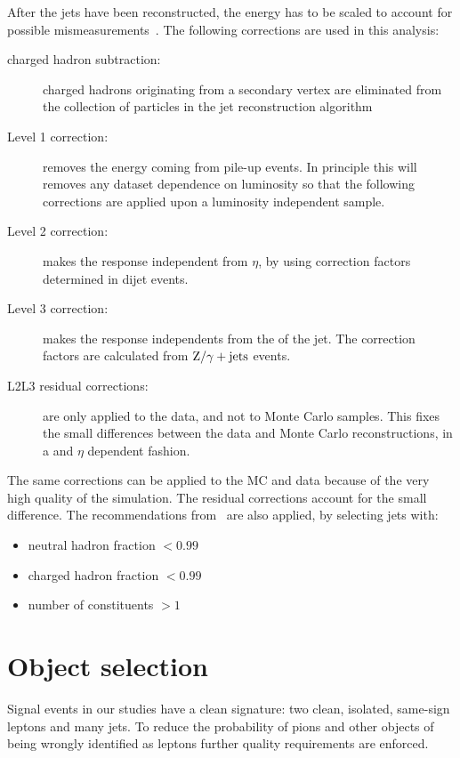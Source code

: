 After the jets have been reconstructed, the energy has to be scaled to
account for possible mismeasurements~\cite{2011JInst...611002C}. The following corrections
are used in this analysis:
\begin{description}
    \item[charged hadron subtraction:] charged hadrons originating from a
        secondary vertex are eliminated from the collection of particles
        in the jet reconstruction algorithm
    \item[Level 1 correction:]removes the energy coming from pile-up
        events. In principle this will removes any dataset dependence on luminosity so that the following corrections are applied upon a luminosity independent sample.
    \item[Level 2 correction:] makes the response independent from
        $\eta$, by using correction factors determined in dijet events.
    \item[Level 3 correction:] makes the response independents from the \pt
        of the jet. The correction factors are calculated from $\mathrm{Z}/\gamma +
        \text{jets}$ events.
    \item[L2L3 residual corrections:] are only applied to the data, and not
        to Monte Carlo samples. This fixes the small differences between the
        data and Monte Carlo reconstructions, in a \pt and $\eta$ dependent
        fashion.
\end{description}
The same corrections can be applied to the MC and data because of the very
high quality of the simulation. The residual corrections account for the
small difference.
The recommendations from~\cite{an:jetid} are also applied, by selecting jets
with:
\begin{itemize}
    \item neutral hadron fraction $< 0.99$
    \item charged hadron fraction $< 0.99$
    \item number of constituents $> 1$
\end{itemize}

\section{Object selection}
Signal events in our studies have a clean signature: two clean, isolated,
same-sign leptons and many jets. To reduce the probability of pions and
other objects of being wrongly identified as leptons further quality
requirements are enforced.
